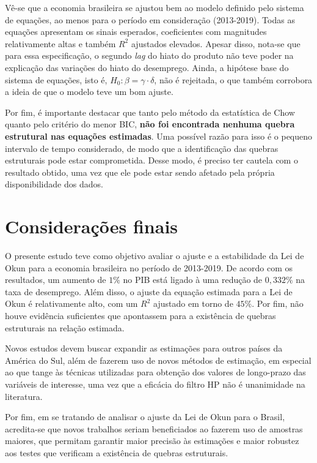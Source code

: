 \documentclass[12pt, openright,oneside, a4paper, english, brazil, section = TITLE, ubsection = Title]{article}
\begin{document}
Vê-se que a economia brasileira se ajustou bem ao modelo definido pelo sistema de equações, ao menos para o período em consideração (2013-2019). Todas as equações apresentam os sinais esperados, coeficientes com magnitudes relativamente altas e também $R^2$ ajustados elevados. Apesar disso, nota-se que para essa especificação, o segundo \textit{lag} do hiato do produto não teve poder na explicação das variações do hiato do desemprego. Ainda, a hipótese base do sistema de equações, isto é, $H_0: \beta = \gamma \cdot \delta$, não é rejeitada, o que também corrobora a ideia de que o modelo teve um bom ajuste.

Por fim, é importante destacar que tanto pelo método da estatística de Chow quanto pelo critério do menor BIC, \textbf{não foi encontrada nenhuma quebra estrutural nas equações estimadas}. Uma possível razão para isso é o pequeno intervalo de tempo considerado, de modo que a identificação das quebras estruturais pode estar comprometida. Desse modo, é preciso ter cautela com o resultado obtido, uma vez que ele pode estar sendo afetado pela própria disponibilidade dos dados.

\section{Considerações finais}

O presente estudo teve como objetivo avaliar o ajuste e a estabilidade da Lei de Okun para a economia brasileira no período de 2013-2019. De acordo com os resultados, um aumento de $1\%$ no PIB está ligado à uma redução de $0,332\%$ na taxa de desemprego. Além disso, o ajuste da equação estimada para a Lei de Okun é relativamente alto, com um $R^2$ ajustado em torno de $45\%$. Por fim, não houve evidência suficientes que apontassem para a existência de quebras estruturais na relação estimada.

Novos estudos devem buscar expandir as estimações para outros países da América do Sul, além de fazerem uso de novos métodos de estimação, em especial ao que tange às técnicas utilizadas para obtenção dos valores de longo-prazo das variáveis de interesse, uma vez que a eficácia do filtro HP não é unanimidade na literatura.

Por fim, em se tratando de analisar o ajuste da Lei de Okun para o Brasil, acredita-se que novos trabalhos seriam beneficiados ao fazerem uso de amostras maiores, que permitam garantir maior precisão às estimações e maior robustez aos testes que verificam a existência de quebras estruturais.


\end{document}
